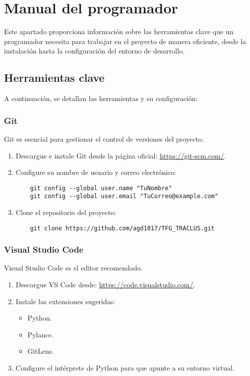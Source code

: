 \section{Manual del programador}

Este apartado proporciona información sobre las herramientas clave que un programador necesita para trabajar en el proyecto de manera eficiente, desde la instalación hasta la configuración del entorno de desarrollo.

\subsection{Herramientas clave}

A continuación, se detallan las herramientas y su configuración:

\subsubsection{Git}
Git es esencial para gestionar el control de versiones del proyecto.

\begin{enumerate}
    \item Descargue e instale Git desde la página oficial: \url{https://git-scm.com/}.
    \item Configure su nombre de usuario y correo electrónico:
    \begin{verbatim}
    git config --global user.name "TuNombre"
    git config --global user.email "TuCorreo@example.com"
    \end{verbatim}
    \item Clone el repositorio del proyecto:
    \begin{verbatim}
    git clone https://github.com/agd1017/TFG_TRACLUS.git
    \end{verbatim}
\end{enumerate}

\subsubsection{Visual Studio Code}
Visual Studio Code es el editor recomendado.

\begin{enumerate}
    \item Descargue VS Code desde: \url{https://code.visualstudio.com/}.
    \item Instale las extensiones sugeridas:
    \begin{itemize}
        \item Python.
        \item Pylance.
        \item GitLens.
    \end{itemize}
    \item Configure el intérprete de Python para que apunte a su entorno virtual.
\end{enumerate}

